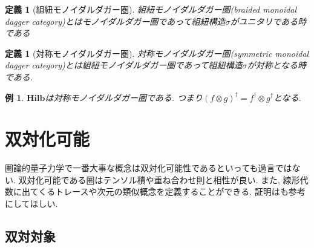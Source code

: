 \documentclass[a4paper,12pt]{ltjsarticle}
\theoremstyle{break}
\newtheorem{defn}[thm]{定義}
\newtheorem{eg}[thm]{例}
\newcommand{\hilb}{\mathbf{Hilb}}
\newcommand{\si}{\sigma}
\newcommand{\da}{\dagger}
\newcommand{\ot}{\otimes}
\numberwithin{equation}{section}
\begin{document}
\begin{defn}[組紐モノイダルダガー圏]
  組紐モノイダルダガー圏(braided monoidal dagger category)とはモノイダルダガー圏であって組紐構造$\si$がユニタリである時である
\end{defn}

\begin{defn}[対称モノイダルダガー圏]
  対称モノイダルダガー圏(symmetric monoidal dagger category)とは組紐モノイダルダガー圏であって組紐構造$\si$が対称となる時である. 
\end{defn}

\begin{eg}
  $\hilb$は対称モノイダルダガー圏である. 
  つまり$(f \ot g)^\da = f^\da \ot g^\da$となる. 
\end{eg}

\newpage

\section{双対化可能}

圏論的量子力学で一番大事な概念は双対化可能性であるといっても過言ではない. 
双対化可能である圏はテンソル積や重ね合わせ則と相性が良い. 
また, 線形代数に出てくるトレースや次元の類似概念を定義することができる. 
証明は\cite{CWM}も参考にしてほしい.   

\subsection{双対対象}
\end{document}
